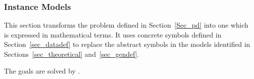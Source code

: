 \documentclass[12pt]{article}
\begin{document}
\subsubsection{Instance Models} \label{sec_instance}    

This section transforms the problem defined in Section~\ref{Sec_pd} into 
one which is expressed in mathematical terms. It uses concrete symbols defined 
in Section~\ref{sec_datadef} to replace the abstract symbols in the models 
identified in Sections~\ref{sec_theoretical} and~\ref{sec_gendef}.

The goals  are solved by .  

~\newline

\end{document}
